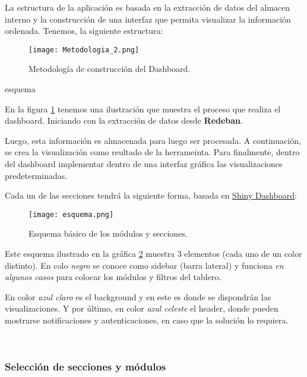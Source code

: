 \documentclass[a4paper]{article}
\begin{document}
La estructura de la aplicación es basada en la extracción de datos del almacen interno y la construcción de una interfaz que permita visualizar la información ordenada. Tenemos, la siguiente estructura:

\begin{figure}[h]
    \centering
	\texttt{[image: Metodologia\_2.png]}
    \caption{Metodología de construcción del Dashboard.}
    \label{fig:metodoologia_2}
\end{figure}esquema

En la figura \ref{fig:metodoologia_2} tenemos una ilustración que muestra el proceso que realiza el dashboard. Iniciando con la extracción de datos desde \textbf{Redeban}. 

Luego, esta información es almacenada para luego ser procesada. A continuación, se crea la visualización como reultado de la herrameinta. Para finalmente, dentro del dashboard implementar dentro de una interfaz gráfica las visualizaciones predeterminadas.

Cada un de las secciones tendrá la siguiente forma, basada en \href{https://rstudio.github.io/shinydashboard/}{Shiny Dashboard}:

\begin{figure}[h]
    \centering
	\texttt{[image: esquema.png]}
    \caption{Esquema básico de los módulos y secciones.}
    \label{fig:esquema}
\end{figure}

Este esquema ilustrado en la gráfica \ref{fig:esquema} muestra 3 elementos (cada uno de un color distinto). En colo \textit{negro} se conoce como sidebar (barra lateral) y funciona \textit{en algunos casos} para colocar los módulos y filtros del tablero.

En color \textit{azul claro} es el background y en este es donde se dispondrán las visualizaciones. Y por último, en color \textit{azul celeste} el header, donde pueden mostrarse notificaciones y autenticaciones, en caso que la solución lo requiera.

\\


\subsubsection{Selección de secciones y módulos}
\end{document}
